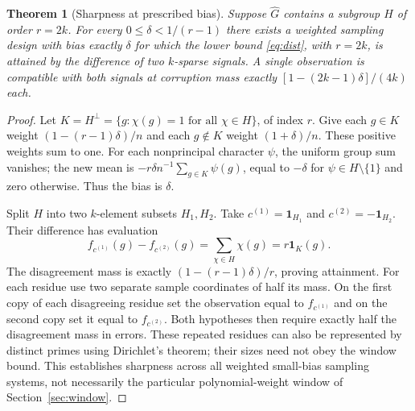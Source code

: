 \documentclass[11pt]{article}
\newtheorem{theorem}{Theorem}[section]
\theoremstyle{remark}\newtheorem{remark}[theorem]{Remark}
\begin{document}
\begin{theorem}[Sharpness at prescribed bias]\label{thm:sharpbias}
Suppose $\widehat G$ contains a subgroup $H$ of order $r=2k$. For every $0\le\delta<1/(r-1)$ there exists a weighted sampling design with bias exactly $\delta$ for which the lower bound \eqref{eq:dist}, with $r=2k$, is attained by the difference of two $k$-sparse signals. A single observation is compatible with both signals at corruption mass exactly $[1-(2k-1)\delta]/(4k)$ each.
\end{theorem}
\begin{proof}
Let $K=H^\perp=\{g:\chi(g)=1\text{ for all }\chi\in H\}$, of index $r$. Give each $g\in K$ weight $(1-(r-1)\delta)/n$ and each $g\notin K$ weight $(1+\delta)/n$. These positive weights sum to one. For each nonprincipal character $\psi$, the uniform group sum vanishes; the new mean is $-r\delta n^{-1}\sum_{g\in K}\psi(g)$, equal to $-\delta$ for $\psi\in H\setminus\{1\}$ and zero otherwise. Thus the bias is $\delta$.

Split $H$ into two $k$-element subsets $H_1,H_2$. Take $c^{(1)}=\mathbf1_{H_1}$ and $c^{(2)}=-\mathbf1_{H_2}$. Their difference has evaluation
\[
 f_{c^{(1)}}(g)-f_{c^{(2)}}(g)=\sum_{\chi\in H}\chi(g)=r\mathbf1_K(g).
\]
The disagreement mass is exactly $(1-(r-1)\delta)/r$, proving attainment. For each residue use two separate sample coordinates of half its mass. On the first copy of each disagreeing residue set the observation equal to $f_{c^{(1)}}$ and on the second copy set it equal to $f_{c^{(2)}}$. Both hypotheses then require exactly half the disagreement mass in errors. These repeated residues can also be represented by distinct primes using Dirichlet's theorem; their sizes need not obey the window bound. This establishes sharpness across all weighted small-bias sampling systems, not necessarily the particular polynomial-weight window of Section~\ref{sec:window}.
\end{proof}
\end{document}
